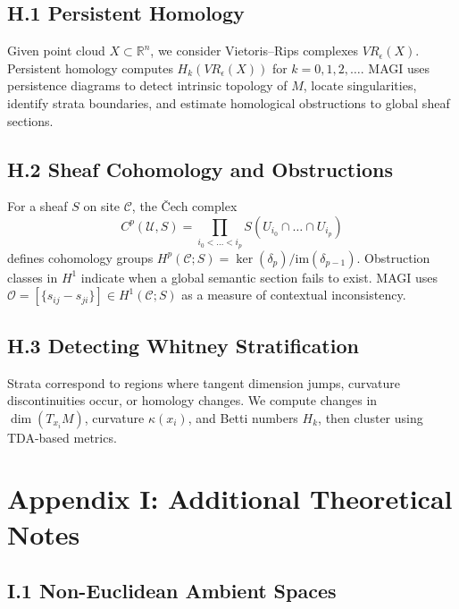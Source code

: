 \documentclass[11pt,a4paper,twocolumn]{article}
\begin{document}
\subsection*{H.1 Persistent Homology}

Given point cloud $X \subset \mathbb{R}^n$, we consider Vietoris--Rips
complexes $VR_\epsilon(X)$. Persistent homology computes
$H_k(VR_\epsilon(X))$ for $k = 0,1,2,\ldots$. MAGI uses persistence
diagrams to detect intrinsic topology of $M$, locate singularities,
identify strata boundaries, and estimate homological obstructions to
global sheaf sections.

\subsection*{H.2 Sheaf Cohomology and Obstructions}

For a sheaf $S$ on site $\mathcal{C}$, the Čech complex
\[
C^p(\mathcal{U}, S) =
\prod_{i_0 < \dots < i_p}
S(U_{i_0} \cap \dots \cap U_{i_p})
\]
defines cohomology groups $H^p(\mathcal{C};S) = \ker(\delta_p) /
\mathrm{im}(\delta_{p-1})$. Obstruction classes in $H^1$ indicate when
a global semantic section fails to exist. MAGI uses
$\mathcal{O} = [\{ s_{ij} - s_{ji} \}] \in H^1(\mathcal{C};S)$
as a measure of contextual inconsistency.

\subsection*{H.3 Detecting Whitney Stratification}

Strata correspond to regions where tangent dimension jumps, curvature
discontinuities occur, or homology changes. We compute changes in
$\dim(T_{x_i}M)$, curvature $\kappa(x_i)$, and Betti numbers $H_k$,
then cluster using TDA-based metrics.


\section*{Appendix I: Additional Theoretical Notes}

\subsection*{I.1 Non-Euclidean Ambient Spaces}
\end{document}
